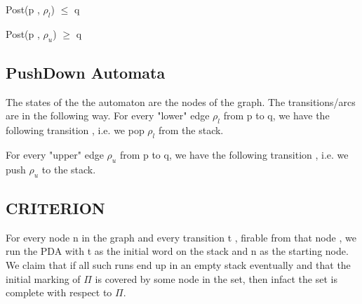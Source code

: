 \documentclass[a4paper,10pt]{article}
\begin{document}
     Post(p , $\rho_{l}$) $\leq$  q   
   
     Post(p , $\rho_{u}$) $\geq$   q
    
   \subsection{PushDown Automata}
   The states of the the automaton are the nodes of the graph. The transitions/arcs are in the following way.
   For every "lower" edge  $\rho_{l}$ from p to q,  we have the following transition , i.e. we  pop $\rho_{l}$ from the stack.
    \begin{center}
     \end{center}
       
       
   For every "upper" edge  $\rho_{u}$ from p to q,  we have the following transition , i.e. we  push $\rho_{u}$ to the stack. 
    \begin{center}
     \end{center}
   
 \subsection{CRITERION}
 
    For every node n in the graph and every transition t , firable from that node , we run the PDA with t as the initial word on the stack and n as the starting node. We claim that if all such runs end up in an empty stack eventually and that the initial marking of $\Pi$ is covered by some node in the set, then infact the set is complete with respect to $\Pi$.   
\end{document}
